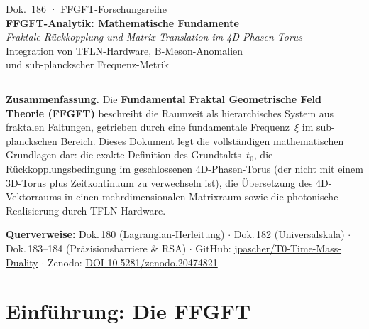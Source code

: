 
\thispagestyle{firstpage}
\begin{center}
  {\small\color{T0gray} Dok.~186 · FFGFT-Forschungsreihe}\\[6pt]
  {\LARGE\bfseries\color{T0blue}
    FFGFT-Analytik: Mathematische Fundamente}\\[6pt]
  {\large\itshape\color{T0gray}
    Fraktale Rückkopplung und Matrix-Translation im 4D-Phasen-Torus}\\[4pt]
  {\normalsize\color{T0gray}
    Integration von TFLN-Hardware, B-Meson-Anomalien\\
    und sub-planckscher Frequenz-Metrik}\\[8pt]
  {\color{T0red}\rule{0.65\linewidth}{1.5pt}}
\end{center}
\vspace{4pt}

\begin{infobox}
\textbf{Zusammenfassung.}
Die \textbf{Fundamental Fraktal Geometrische Feld Theorie (FFGFT)} beschreibt
die Raumzeit als hierarchisches System aus fraktalen Faltungen, getrieben
durch eine fundamentale Frequenz~$\xi$ im sub-planckschen Bereich.
Dieses Dokument legt die vollständigen mathematischen Grundlagen dar:
die exakte Definition des Grundtakts~$t_0$, die Rückkopplungsbedingung im
geschlossenen 4D-Phasen-Torus (der nicht mit einem 3D-Torus plus Zeitkontinuum
zu verwechseln ist), die Übersetzung des 4D-Vektorraums in einen mehrdimensionalen
Matrixraum sowie die photonische Realisierung durch TFLN-Hardware.

\smallskip\noindent\textbf{Querverweise:}
Dok.\,180 (Lagrangian-Herleitung) $\cdot$
Dok.\,182 (Universalskala) $\cdot$
Dok.\,183--184 (Präzisionsbarriere \& RSA) $\cdot$
GitHub: \href{https://github.com/jpascher/T0-Time-Mass-Duality}{jpascher/T0-Time-Mass-Duality} $\cdot$
Zenodo: \href{https://zenodo.org/records/20474821}{DOI 10.5281/zenodo.20474821}
\end{infobox}

\tableofcontents
\bigskip

\section{Einführung: Die FFGFT}

